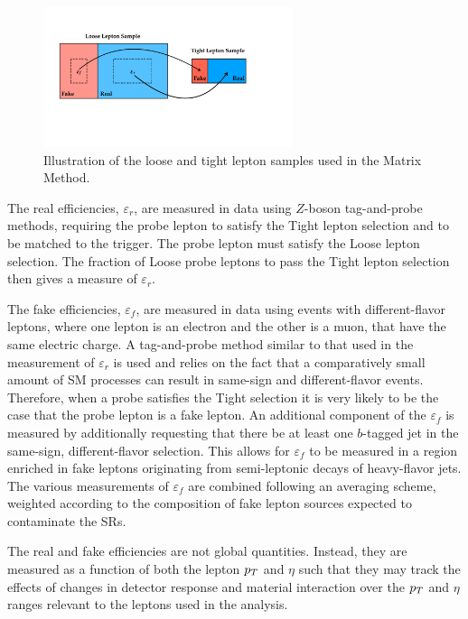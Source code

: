 \begin{figure}[!htb]
    \begin{center}
        \includegraphics[width=0.65\textwidth]{figures/common_ana/fakes/fake_effs_illustration}
        \caption{
            Illustration of the loose and tight lepton samples used in the Matrix Method.
        }
        \label{fig:fake_effs}
    \end{center}
\end{figure}

The real efficiencies, $\varepsilon_r$, are measured in data using $Z$-boson tag-and-probe methods, requiring the probe lepton
to satisfy the Tight lepton selection and to be matched to the trigger.
The probe lepton must satisfy the Loose lepton selection.
The fraction of Loose probe leptons to pass the Tight lepton selection then gives a measure of $\varepsilon_r$.

The fake efficiencies, $\varepsilon_f$, are measured in data using events with different-flavor leptons,
where one lepton is an electron and the other is a muon, that have the same electric charge.
A tag-and-probe method similar to that used in the measurement of $\varepsilon_r$ is used
and relies on the fact that a comparatively small amount of SM processes can result in same-sign
and different-flavor events.
Therefore, when a probe satisfies the Tight selection it is very likely to be the case that the
probe lepton is a fake lepton.
An additional component of the $\varepsilon_f$ is measured by additionally requesting that there
be at least one $b$-tagged jet in the same-sign, different-flavor selection.
This allows for $\varepsilon_f$ to be measured in a region enriched in fake leptons originating
from semi-leptonic decays of heavy-flavor jets.
The various measurements of $\varepsilon_f$ are combined following an averaging scheme, weighted according
to the composition of fake lepton sources expected to contaminate the SRs.

The real and fake efficiencies are not global quantities.
Instead, they are measured as a function of both the lepton $p_{T}$ and $\eta$
such that they may track the effects of changes in detector response and
material interaction over the $p_{T}$ and $\eta$ ranges relevant to the leptons used in the analysis.

